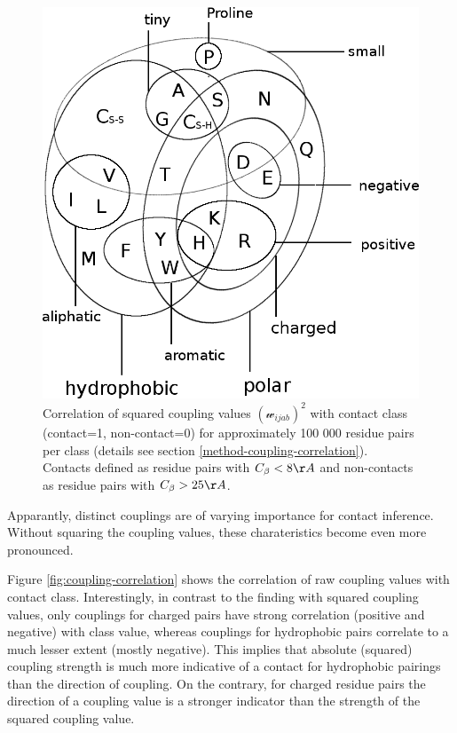 \documentclass[12pt,a4paper,twoside]{book}
\newcommand{\Cb}{C_\beta}
\newcommand{\wijab}{\mathcal{w}_{ijab}}
\theoremstyle{definition}
\theoremstyle{definition}
\theoremstyle{remark}
\begin{document}
\begin{figure}
\includegraphics[width=1\linewidth]{img/amino_acid_physico_chemical_properties_venn_diagramm} \caption{Correlation of squared coupling values
\((\wijab)^2\) with contact class (contact=1, non-contact=0) for
approximately 100 000 residue pairs per class (details see section
\ref{method-coupling-correlation}). Contacts defined as residue pairs
with \(\Cb < 8 \AA\) and non-contacts as residue pairs with
\(\Cb > 25 \AA\).}\label{fig:sq-coupling-correlation}
\end{figure}

Apparantly, distinct couplings are of varying importance for contact
inference. Without squaring the coupling values, these charateristics
become even more pronounced.

Figure \ref{fig:coupling-correlation} shows the correlation of raw
coupling values with contact class. Interestingly, in contrast to the
finding with squared coupling values, only couplings for charged pairs
have strong correlation (positive and negative) with class value,
whereas couplings for hydrophobic pairs correlate to a much lesser
extent (mostly negative). This implies that absolute (squared) coupling
strength is much more indicative of a contact for hydrophobic pairings
than the direction of coupling. On the contrary, for charged residue
pairs the direction of a coupling value is a stronger indicator than the
strength of the squared coupling value.
\end{document}
